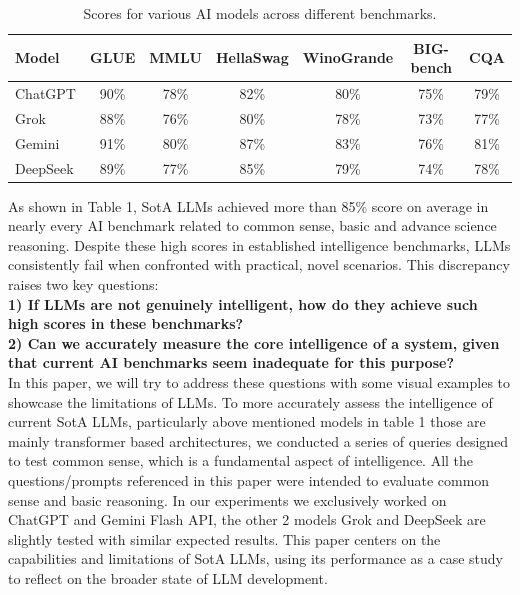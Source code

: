 \documentclass[11pt]{scrartcl}
\begin{document}
\begin{table}[h]
\centering
\begin{tabular}{lcccccc}
\hline
Model     & GLUE & MMLU & HellaSwag & WinoGrande & BIG-bench & CQA \\
\hline
ChatGPT          & 90\% & 78\% & 82\%      & 80\%       & 75\%     & 79\%         \\
Grok             & 88\% & 76\% & 80\%      & 78\%       & 73\%     & 77\%         \\
Gemini           & 91\% & 80\% & 87\%      & 83\%       & 76\%     & 81\%         \\
DeepSeek         & 89\% & 77\% & 85\%      & 79\%       & 74\%     & 78\%         \\
\hline
\end{tabular}
\caption{Scores for various AI models across different benchmarks.}
\label{tab:benchmark_scores}
\end{table}

As shown in Table 1, SotA LLMs achieved more than 85\% score on average in nearly every AI benchmark related to common sense, basic and advance science reasoning. Despite these high scores in established intelligence benchmarks, LLMs consistently fail when confronted with practical, novel scenarios. This discrepancy raises two key questions: \\
\textbf{1) If LLMs are not genuinely intelligent, how do they achieve such high scores in these benchmarks?} \\
\textbf{ 2) Can we accurately measure the core intelligence of a system, given that current AI benchmarks seem inadequate for this purpose?} \\
In this paper, we will try to address these questions with some visual examples to showcase the limitations of LLMs.
To more accurately assess the intelligence of current SotA LLMs, particularly above mentioned models in table 1 those are mainly transformer based architectures, we conducted a series of queries designed to test common sense, which is a fundamental aspect of intelligence. All the questions/prompts referenced in this paper were intended to evaluate common sense and basic reasoning. In our experiments we exclusively worked on ChatGPT and Gemini Flash API, the other 2 models Grok and DeepSeek are slightly tested with similar expected results. This paper centers on the capabilities and limitations of SotA LLMs, using its performance as a case study to reflect on the broader state of LLM development. \\
\end{document}
